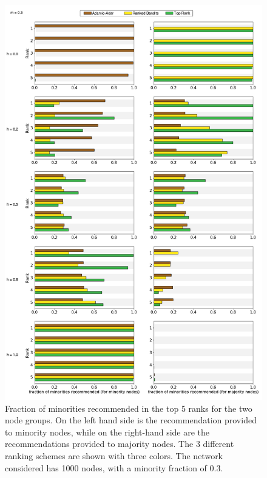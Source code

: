 \begin{figure}
	\includegraphics[scale=0.28]{images/proposal_figure_3_4}
	\caption{Fraction of minorities recommended in the top 5 ranks for the two node groups. On the left hand side is the recommendation provided to minority nodes, while on the right-hand side are the recommendations provided to majority nodes. The 3 different ranking schemes are shown with three colors. The network considered has 1000 nodes, with a minority fraction of 0.3.}
	\label{fig-rank_4}
\end{figure}
